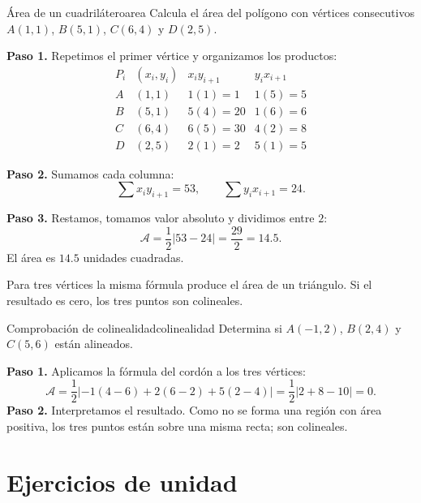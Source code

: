 \begin{example}{Área de un cuadrilátero}{area}
Calcula el área del polígono con vértices consecutivos
$A(1,1)$, $B(5,1)$, $C(6,4)$ y $D(2,5)$.
\begin{solution}
\textbf{Paso 1.} Repetimos el primer vértice y organizamos los productos:
\[
\begin{array}{c|c|c|c}
P_i & (x_i,y_i) & x_i y_{i+1} & y_i x_{i+1}\\ \hline
A&(1,1)&1(1)=1&1(5)=5\\
B&(5,1)&5(4)=20&1(6)=6\\
C&(6,4)&6(5)=30&4(2)=8\\
D&(2,5)&2(1)=2&5(1)=5
\end{array}
\]

\textbf{Paso 2.} Sumamos cada columna:
\[
\sum x_i y_{i+1}=53,
\qquad
\sum y_i x_{i+1}=24.
\]

\textbf{Paso 3.} Restamos, tomamos valor absoluto y dividimos entre $2$:
\[
\mathcal A=\frac12|53-24|=\frac{29}{2}=14.5.
\]
El área es $14.5$ unidades cuadradas.
\end{solution}
\end{example}

Para tres vértices la misma fórmula produce el área de un triángulo. Si el
resultado es cero, los tres puntos son colineales.

\begin{example}{Comprobación de colinealidad}{colinealidad}
Determina si $A(-1,2)$, $B(2,4)$ y $C(5,6)$ están alineados.
\begin{solution}
\textbf{Paso 1.} Aplicamos la fórmula del cordón a los tres vértices:
\[
\mathcal A=\frac12|-1(4-6)+2(6-2)+5(2-4)|
=\frac12|2+8-10|=0.
\]
\textbf{Paso 2.} Interpretamos el resultado. Como no se forma una región con
área positiva, los tres puntos están sobre una misma recta; son colineales.
\end{solution}
\end{example}

\section{Ejercicios de unidad}

